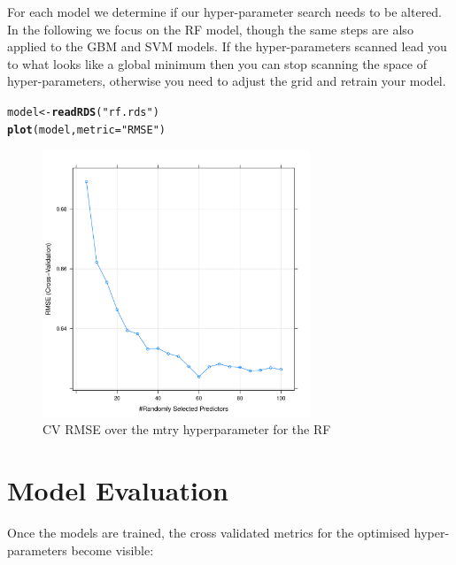 \documentclass[twoside,a4wide,12pt]{article}\usepackage[]{graphicx}\usepackage[]{color}
\makeatletter
\newcommand{\hlstr}[1]{\textcolor[rgb]{0.192,0.494,0.8}{#1}}%
\newcommand{\hlstd}[1]{\textcolor[rgb]{0.345,0.345,0.345}{#1}}%
\newcommand{\hlkwb}[1]{\textcolor[rgb]{0.69,0.353,0.396}{#1}}%
\newcommand{\hlkwc}[1]{\textcolor[rgb]{0.333,0.667,0.333}{#1}}%
\newcommand{\hlkwd}[1]{\textcolor[rgb]{0.737,0.353,0.396}{\textbf{#1}}}%
\newenvironment{kframe}{%
 \def\at@end@of@kframe{}%
 \ifinner\ifhmode%
  \def\at@end@of@kframe{\end{minipage}}%
  \begin{minipage}{\columnwidth}%
 \fi\fi%
 \def\FrameCommand##1{\hskip\@totalleftmargin \hskip-\fboxsep
 \colorbox{shadecolor}{##1}\hskip-\fboxsep
     \hskip-\linewidth \hskip-\@totalleftmargin \hskip\columnwidth}%
 \MakeFramed {\advance\hsize-\width
   \@totalleftmargin\z@ \linewidth\hsize
   \@setminipage}}%
 {\par\unskip\endMakeFramed%
 \at@end@of@kframe}
\newenvironment{knitrout}{}{} %
\makeatother
\begin{document}
For each model we determine if our hyper-parameter search needs to be altered. In the following we focus on the RF model, though the same steps are also applied to the GBM and SVM models. If the hyper-parameters scanned lead you to what looks like a global minimum then you can stop scanning the space of hyper-parameters, otherwise you need to adjust the grid and retrain your model.
\begin{knitrout}
\color{fgcolor}\begin{kframe}
\begin{alltt}
\hlstd{model} \hlkwb{<-} \hlkwd{readRDS}\hlstd{(}\hlstr{"rf.rds"}\hlstd{)}
\hlkwd{plot}\hlstd{(model,} \hlkwc{metric} \hlstd{=} \hlstr{"RMSE"}\hlstd{)}
\end{alltt}
\end{kframe}\begin{figure}[]


{\centering \includegraphics[width=8cm]{figure/unnamed-chunk-17} 

}

\caption[CV RMSE over the mtry hyperparameter for the RF]{CV RMSE over the mtry hyperparameter for the RF\label{fig:unnamed-chunk-17}}
\end{figure}


\end{knitrout}

\section{Model Evaluation}

Once the models are trained, the cross validated metrics for the optimised hyper-parameters become visible:
\end{document}
